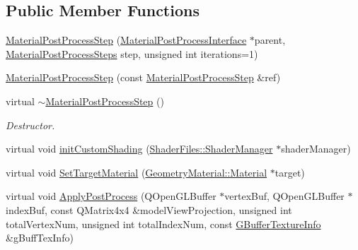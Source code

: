 \subsection*{Public Member Functions}
\begin{DoxyCompactItemize}
\item 
\mbox{\hyperlink{class_geometry_engine_1_1_custom_shading_1_1_material_post_process_step_a58a79c5f61a28a04535e0e4527899d1c}{Material\+Post\+Process\+Step}} (\mbox{\hyperlink{class_geometry_engine_1_1_custom_shading_1_1_material_post_process_interface}{Material\+Post\+Process\+Interface}} $\ast$parent, \mbox{\hyperlink{namespace_geometry_engine_1_1_custom_shading_af8b09b91ca7086f4f67a5d4181f35e58}{Material\+Post\+Process\+Steps}} step, unsigned int iterations=1)
\item 
\mbox{\hyperlink{class_geometry_engine_1_1_custom_shading_1_1_material_post_process_step_aa789b67513d9487af26f32a92253df76}{Material\+Post\+Process\+Step}} (const \mbox{\hyperlink{class_geometry_engine_1_1_custom_shading_1_1_material_post_process_step}{Material\+Post\+Process\+Step}} \&ref)
\item 
\mbox{\label{class_geometry_engine_1_1_custom_shading_1_1_material_post_process_step_a50a1cf4f8e01eebbeddf93746a4da34c}} 
virtual \mbox{\hyperlink{class_geometry_engine_1_1_custom_shading_1_1_material_post_process_step_a50a1cf4f8e01eebbeddf93746a4da34c}{$\sim$\+Material\+Post\+Process\+Step}} ()
\begin{DoxyCompactList}\small\item\em Destructor. \end{DoxyCompactList}\item 
virtual void \mbox{\hyperlink{class_geometry_engine_1_1_custom_shading_1_1_material_post_process_step_af215423d3bda8986ca7b91d76663dc40}{init\+Custom\+Shading}} (\mbox{\hyperlink{class_shader_files_1_1_shader_manager}{Shader\+Files\+::\+Shader\+Manager}} $\ast$shader\+Manager)
\item 
virtual void \mbox{\hyperlink{class_geometry_engine_1_1_custom_shading_1_1_material_post_process_step_ab0e1e6e56194f67578d53ca5cc0f79eb}{Set\+Target\+Material}} (\mbox{\hyperlink{class_geometry_engine_1_1_geometry_material_1_1_material}{Geometry\+Material\+::\+Material}} $\ast$target)
\item 
virtual void \mbox{\hyperlink{class_geometry_engine_1_1_custom_shading_1_1_material_post_process_step_a3caabead68eaf1b4f19e9cd726132741}{Apply\+Post\+Process}} (Q\+Open\+G\+L\+Buffer $\ast$vertex\+Buf, Q\+Open\+G\+L\+Buffer $\ast$index\+Buf, const Q\+Matrix4x4 \&model\+View\+Projection, unsigned int total\+Vertex\+Num, unsigned int total\+Index\+Num, const \mbox{\hyperlink{class_geometry_engine_1_1_g_buffer_texture_info}{G\+Buffer\+Texture\+Info}} \&g\+Buff\+Tex\+Info)

\end{DoxyCompactItemize}
